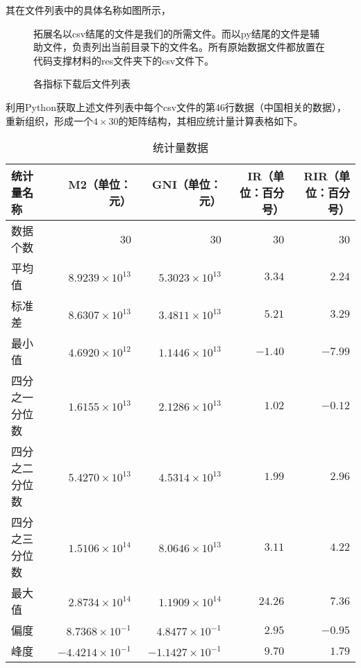 其在文件列表中的具体名称如图所示，

\begin{figure}[h]
	\centering
	\begin{minipage}[t]{0.6\textwidth}
		\centering
		\caption{各指标下载后文件列表}
		\label{fig:IndicatorList}
	\end{minipage}%
	\hspace*{1cm} %
	\begin{minipage}[t]{0.34\textwidth}
		\raggedright %
		\vspace{-4.7cm} %
		\qquad 拓展名以csv结尾的文件是我们的所需文件。而以py结尾的文件是辅助文件，负责列出当前目录下的文件名。所有原始数据文件都放置在代码支撑材料的res文件夹下的csv文件下。
	\end{minipage}
\end{figure}


利用Python获取上述文件列表中每个csv文件的第46行数据（中国相关的数据），重新组织，形成一个$4 \times 30$的矩阵结构，其相应统计量计算表格如下。

\begin{table}[htbp]
	\centering
	\caption{统计量数据}
	\footnotesize %
	\begin{tabular}{@{}lrrrr@{}}
		\toprule
		统计量名称 & M2（单位：元） & GNI（单位：元） & IR（单位：百分号） & RIR（单位：百分号） \\ \midrule
		数据个数 & 30 & 30 & 30 & 30 \\
		平均值 & $8.9239 \times 10^{13}$ & $5.3023 \times 10^{13}$ & $3.34$ & $2.24$ \\
		标准差 & $8.6307 \times 10^{13}$ & $3.4811 \times 10^{13}$ & $5.21$ & $3.29$ \\
		最小值 & $4.6920 \times 10^{12}$ & $1.1446 \times 10^{13}$ & $-1.40$ & $-7.99$ \\
		四分之一分位数 & $1.6155 \times 10^{13}$ & $2.1286 \times 10^{13}$ & $1.02$ & $-0.12$ \\
		四分之二分位数 & $5.4270 \times 10^{13}$ & $4.5314 \times 10^{13}$ & $1.99$ & $2.96$ \\
		四分之三分位数 & $1.5106 \times 10^{14}$ & $8.0646 \times 10^{13}$ & $3.11$ & $4.22$ \\
		最大值 & $2.8734 \times 10^{14}$ & $1.1909 \times 10^{14}$ & $24.26$ & $7.36$ \\
		偏度 & $8.7368 \times 10^{-1}$ & $4.8477 \times 10^{-1}$ & $2.95$ & $-0.95$ \\
		峰度 & $-4.4214 \times 10^{-1}$ & $-1.1427 \times 10^{-1}$ & $9.70$ & $1.79$ \\ 
		\bottomrule
	\end{tabular}
	\label{tab:statistics}
\end{table}


